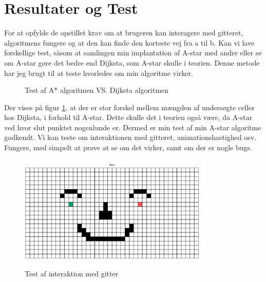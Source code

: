 \documentclass[12pt]{article}
\begin{document}
\section{Resultater og Test}
For at opfylde de opstillet krav om at brugeren kan interagere med gitteret, algoritmens fungere og at den kan finde den korteste vej fra a til b. Kan vi lave forskellige test, såsom at samlingen min implantation af A-star med andre eller se om A-star gøre det bedre end Dijksta, som A-star skulle i teorien. Denne metode har jeg brugt til at teste hvorledes om min algoritme virker. \\
\begin{figure}[ht]
  \centering
  \caption{Test af A* algoritmen VS. Dijksta algoritmen}\label{fig:testAlgortime}
\end{figure}
Der vises på figur \ref{fig:testAlgortime}, at der er stor forskel mellem mængden af undersøgte celler hos Dijksta, i forhold til A-star. Dette skulle det i teorien også være, da A-star ved hvor slut punktet nogenlunde er. Dermed er min test af min A-star algoritme godkendt. 
Vi kan teste om interaktionen med gitteret, animationshastighed osv. Fungere, med simpelt at prøve at se om det virker, samt om der er nogle bugs.
\begin{figure}[ht]
  \centering
  {\includegraphics[width=9cm]{../AppPreview2.PNG} }%
  \caption{Test af interaktion med gitter}\label{fig:testInteraktion}
\end{figure}
\end{document}
